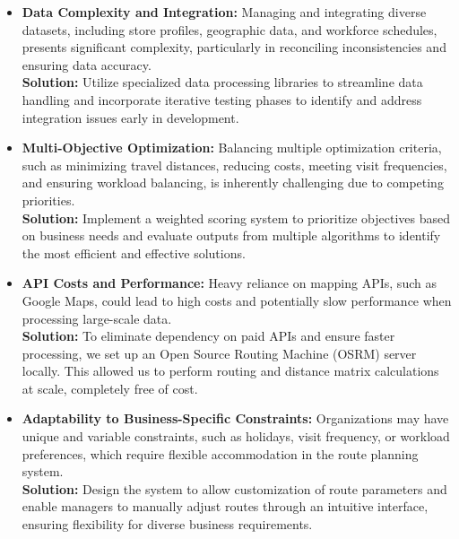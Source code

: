 \begin{itemize}
    \item \textbf{Data Complexity and Integration:} Managing and integrating diverse datasets, including store profiles, geographic data, and workforce schedules, presents significant complexity, particularly in reconciling inconsistencies and ensuring data accuracy. \\
    \textbf{Solution:} Utilize specialized data processing libraries to streamline data handling and incorporate iterative testing phases to identify and address integration issues early in development.

    \item \textbf{Multi-Objective Optimization:} Balancing multiple optimization criteria, such as minimizing travel distances, reducing costs, meeting visit frequencies, and ensuring workload balancing, is inherently challenging due to competing priorities. \\
    \textbf{Solution:} Implement a weighted scoring system to prioritize objectives based on business needs and evaluate outputs from multiple algorithms to identify the most efficient and effective solutions.

    \item \textbf{API Costs and Performance:} Heavy reliance on mapping APIs, such as Google Maps, could lead to high costs and potentially slow performance when processing large-scale data. \\
    \textbf{Solution:} To eliminate dependency on paid APIs and ensure faster processing, we set up an Open Source Routing Machine (OSRM) server locally. This allowed us to perform routing and distance matrix calculations at scale, completely free of cost.    

    \item \textbf{Adaptability to Business-Specific Constraints:} Organizations may have unique and variable constraints, such as holidays, visit frequency, or workload preferences, which require flexible accommodation in the route planning system. \\
    \textbf{Solution:} Design the system to allow customization of route parameters and enable managers to manually adjust routes through an intuitive interface, ensuring flexibility for diverse business requirements.


\end{itemize}
